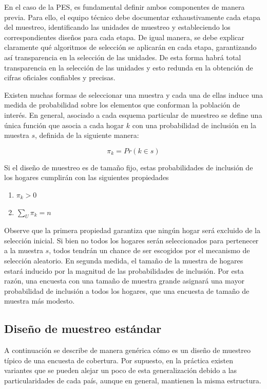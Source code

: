 \documentclass[
  12pt,
]{book}
\providecommand{\tightlist}{%
  \setlength{\itemsep}{0pt}\setlength{\parskip}{0pt}}
\begin{document}
En el caso de la PES, es fundamental definir ambos componentes de manera previa. Para ello, el equipo técnico debe documentar exhaustivamente cada etapa del muestreo, identificando las unidades de muestreo y estableciendo los correspondientes diseños para cada etapa. De igual manera, se debe explicar claramente qué algoritmos de selección se aplicarán en cada etapa, garantizando así transparencia en la selección de las unidades. De esta forma habrá total transparencia en la selección de las unidades y esto redunda en la obtención de cifras oficiales confiables y precisas.

Existen muchas formas de seleccionar una muestra y cada una de ellas induce una medida de probabilidad sobre los elementos que conforman la población de interés. En general, asociado a cada esquema particular de muestreo se define una única función que asocia a cada hogar \(k\) con una probabilidad de inclusión en la muestra \(s\), definida de la siguiente manera:

\[\pi_k = Pr (k \in s)\]

Si el diseño de muestreo es de tamaño fijo, estas probabilidades de inclusión de los hogares cumplirán con las siguientes propiedades

\begin{enumerate}
\def\labelenumi{\arabic{enumi}.}
\tightlist
\item
  \(\pi_k > 0\)
\item
  \(\sum_U \pi_k = n\)
\end{enumerate}

Observe que la primera propiedad garantiza que ningún hogar será excluido de la selección inicial. Si bien no todos los hogares serán seleccionados para pertenecer a la muestra \(s\), todos tendrán un chance de ser escogidos por el mecanismo de selección aleatorio. En segunda medida, el tamaño de la muestra de hogares estará inducido por la magnitud de las probabilidades de inclusión. Por esta razón, una encuesta con una tamaño de muestra grande asignará una mayor probabilidad de inclusión a todos los hogares, que una encuesta de tamaño de muestra más modesto.

\subsection{Diseño de muestreo estándar}\label{diseuxf1o-de-muestreo-estuxe1ndar}

A continuación se describe de manera genérica cómo es un diseño de muestreo típico de una encuesta de cobertura. Por supuesto, en la práctica existen variantes que se pueden alejar un poco de esta generalización debido a las particularidades de cada país, aunque en general, mantienen la misma estructura.
\end{document}
